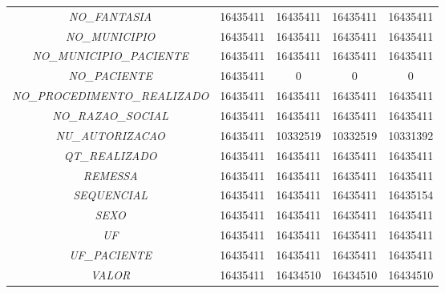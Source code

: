 \documentclass[
  12,
  table]{proadi}
\begin{document}
\begin{longtable}{>{}ccccc}
\addlinespace
\em{NO\_FANTASIA} & 16435411 & 16435411 & 16435411 & 16435411\\
\em{NO\_MUNICIPIO} & 16435411 & 16435411 & 16435411 & 16435411\\
\em{NO\_MUNICIPIO\_PACIENTE} & 16435411 & 16435411 & 16435411 & 16435411\\
\em{NO\_PACIENTE} & 16435411 & 0 & 0 & 0\\
\em{NO\_PROCEDIMENTO\_REALIZADO} & 16435411 & 16435411 & 16435411 & 16435411\\
\addlinespace
\em{NO\_RAZAO\_SOCIAL} & 16435411 & 16435411 & 16435411 & 16435411\\
\em{NU\_AUTORIZACAO} & 16435411 & 10332519 & 10332519 & 10331392\\
\em{QT\_REALIZADO} & 16435411 & 16435411 & 16435411 & 16435411\\
\em{REMESSA} & 16435411 & 16435411 & 16435411 & 16435411\\
\em{SEQUENCIAL} & 16435411 & 16435411 & 16435411 & 16435154\\
\addlinespace
\em{SEXO} & 16435411 & 16435411 & 16435411 & 16435411\\
\em{UF} & 16435411 & 16435411 & 16435411 & 16435411\\
\em{UF\_PACIENTE} & 16435411 & 16435411 & 16435411 & 16435411\\
\em{VALOR} & 16435411 & 16434510 & 16434510 & 16434510\\*
\end{longtable}
\endgroup{}
\end{document}
